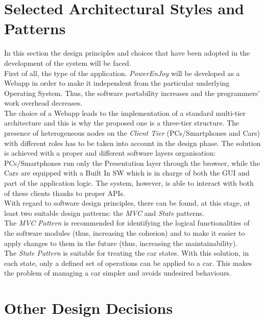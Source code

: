 \documentclass[11pt,a4paper]{report}
\begin{document}
\section{Selected Architectural Styles and Patterns}
In this section the design principles and choices that have been adopted in the development of the system will be faced.\\First of all, the type of the application. \textit{PowerEnJoy} will be developed as a Webapp in order to make it independent from the particular underlying Operating System. Thus, the software portability increases and the programmers' work overhead decreases.\\The choice of a Webapp leads to the implementation of a standard multi-tier architecture and this is why the proposed one is a three-tier structure. The presence of heterogeneous nodes on the \textit{Client Tier} (PCs/Smartphones and Cars) with different roles  has to be taken into account in the design phase. The solution is achieved with a proper and different software layers organisation: PCs/Smartphones run only the Presentation layer through the browser, while the Cars are equipped with a Built In SW which is in charge of both the GUI and part of the application logic. The system, however, is able to interact with both of these clients thanks to proper APIs.\\With regard to software design principles, there can be found, at this stage, at least two suitable design patterns: the \textit{MVC} and \textit{State} patterns.\\The \textit{MVC Pattern} is recommended for identifying the logical functionalities of the software modules (thus, increasing the cohesion) and to make it easier to apply changes to them in the future (thus, increasing the maintainability).\\The \textit{State Pattern} is suitable for treating the car states. With this solution, in each state, only a defined set of operations can be applied to a car. This makes the problem of managing a car simpler and avoids undesired behaviours.
\section{Other Design Decisions}
\end{document}
